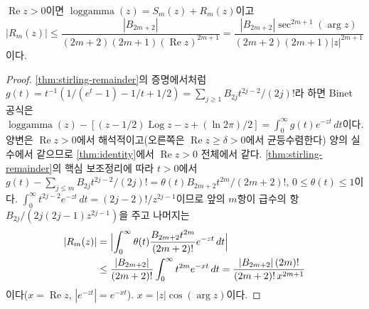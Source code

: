 \begin{proposition}
\label{prop:stirling-complex}
$\operatorname{Re}z>0$이면 $\operatorname{loggamma}(z)=S_m(z)+R_m(z)$이고
\[
|R_m(z)|\le\frac{|B_{2m+2}|}{(2m+2)(2m+1)(\operatorname{Re}z)^{2m+1}}=\frac{|B_{2m+2}|\sec^{2m+1}(\arg z)}{(2m+2)(2m+1)|z|^{2m+1}}
\]
이다.
\end{proposition}

\begin{proof}
\cref{thm:stirling-remainder}의 증명에서처럼 $g(t)=t^{-1}(1/(e^t-1)-1/t+1/2)=\sum_{j\ge1}B_{2j}t^{2j-2}/(2j)!$라 하면 Binet 공식은 $\operatorname{loggamma}(z)-[(z-1/2)\operatorname{Log}z-z+(\ln2\pi)/2]=\int_0^\infty g(t)e^{-zt}\,dt$이다. 양변은 $\operatorname{Re}z>0$에서 해석적이고(오른쪽은 $\operatorname{Re}z\ge\delta>0$에서 균등수렴한다) 양의 실수에서 같으므로 \cref{thm:identity}에서 $\operatorname{Re}z>0$ 전체에서 같다. \cref{thm:stirling-remainder}의 핵심 보조정리에 따라 $t>0$에서 $g(t)-\sum_{j\le m}B_{2j}t^{2j-2}/(2j)!=\theta(t)B_{2m+2}t^{2m}/(2m+2)!$, $0\le\theta(t)\le1$이다. $\int_0^\infty t^{2j-2}e^{-zt}\,dt=(2j-2)!/z^{2j-1}$이므로 앞의 $m$항이 급수의 항 $B_{2j}/(2j(2j-1)z^{2j-1})$을 주고 나머지는
\[
\begin{aligned}
|R_m(z)|&=\Bigl|\int_0^\infty\theta(t)\frac{B_{2m+2}t^{2m}}{(2m+2)!}e^{-zt}\,dt\Bigr|\\
&\le\frac{|B_{2m+2}|}{(2m+2)!}\int_0^\infty t^{2m}e^{-xt}\,dt=\frac{|B_{2m+2}|\,(2m)!}{(2m+2)!\,x^{2m+1}}
\end{aligned}
\]
이다($x=\operatorname{Re}z$, $|e^{-zt}|=e^{-xt}$). $x=|z|\cos(\arg z)$이다.
\end{proof}

